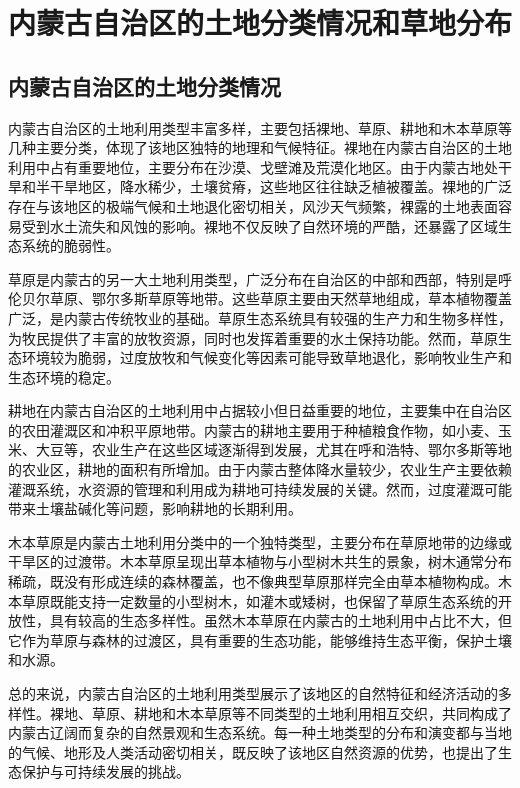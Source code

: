 \documentclass[AutoFakeBold]{LZUThesis-PgD&PhD}
\begin{document}
    \section{内蒙古自治区的土地分类情况和草地分布}

    \subsection{内蒙古自治区的土地分类情况}
		
		内蒙古自治区的土地利用类型丰富多样，主要包括裸地、草原、耕地和木本草原等几种主要分类，体现了该地区独特的地理和气候特征。裸地在内蒙古自治区的土地利用中占有重要地位，主要分布在沙漠、戈壁滩及荒漠化地区。由于内蒙古地处干旱和半干旱地区，降水稀少，土壤贫瘠，这些地区往往缺乏植被覆盖。裸地的广泛存在与该地区的极端气候和土地退化密切相关，风沙天气频繁，裸露的土地表面容易受到水土流失和风蚀的影响。裸地不仅反映了自然环境的严酷，还暴露了区域生态系统的脆弱性。
		
		草原是内蒙古的另一大土地利用类型，广泛分布在自治区的中部和西部，特别是呼伦贝尔草原、鄂尔多斯草原等地带。这些草原主要由天然草地组成，草本植物覆盖广泛，是内蒙古传统牧业的基础。草原生态系统具有较强的生产力和生物多样性，为牧民提供了丰富的放牧资源，同时也发挥着重要的水土保持功能。然而，草原生态环境较为脆弱，过度放牧和气候变化等因素可能导致草地退化，影响牧业生产和生态环境的稳定。
		
		耕地在内蒙古自治区的土地利用中占据较小但日益重要的地位，主要集中在自治区的农田灌溉区和冲积平原地带。内蒙古的耕地主要用于种植粮食作物，如小麦、玉米、大豆等，农业生产在这些区域逐渐得到发展，尤其在呼和浩特、鄂尔多斯等地的农业区，耕地的面积有所增加。由于内蒙古整体降水量较少，农业生产主要依赖灌溉系统，水资源的管理和利用成为耕地可持续发展的关键。然而，过度灌溉可能带来土壤盐碱化等问题，影响耕地的长期利用。
		
		木本草原是内蒙古土地利用分类中的一个独特类型，主要分布在草原地带的边缘或干旱区的过渡带。木本草原呈现出草本植物与小型树木共生的景象，树木通常分布稀疏，既没有形成连续的森林覆盖，也不像典型草原那样完全由草本植物构成。木本草原既能支持一定数量的小型树木，如灌木或矮树，也保留了草原生态系统的开放性，具有较高的生态多样性。虽然木本草原在内蒙古的土地利用中占比不大，但它作为草原与森林的过渡区，具有重要的生态功能，能够维持生态平衡，保护土壤和水源。
		
		总的来说，内蒙古自治区的土地利用类型展示了该地区的自然特征和经济活动的多样性。裸地、草原、耕地和木本草原等不同类型的土地利用相互交织，共同构成了内蒙古辽阔而复杂的自然景观和生态系统。每一种土地类型的分布和演变都与当地的气候、地形及人类活动密切相关，既反映了该地区自然资源的优势，也提出了生态保护与可持续发展的挑战。
		
\end{document}
